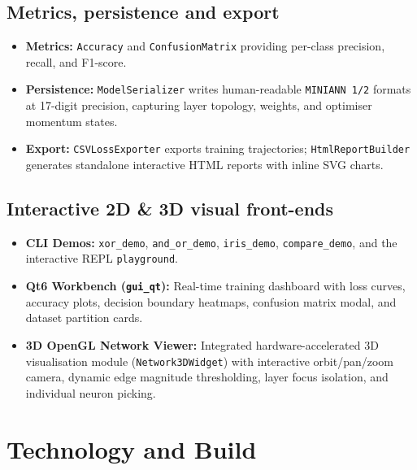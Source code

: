\documentclass[11pt,a4paper]{article}
\begin{document}
\subsection{Metrics, persistence and export}
\begin{itemize}[itemsep=1pt]
    \item \textbf{Metrics:} \texttt{Accuracy} and \texttt{ConfusionMatrix} providing per-class precision, recall, and F1-score.
    \item \textbf{Persistence:} \texttt{ModelSerializer} writes human-readable \texttt{MINIANN 1/2} formats at 17-digit precision, capturing layer topology, weights, and optimiser momentum states.
    \item \textbf{Export:} \texttt{CSVLossExporter} exports training trajectories; \texttt{HtmlReportBuilder} generates standalone interactive HTML reports with inline SVG charts.
\end{itemize}

\subsection{Interactive 2D \& 3D visual front-ends}
\begin{itemize}[itemsep=1pt]
    \item \textbf{CLI Demos:} \texttt{xor\_demo}, \texttt{and\_or\_demo}, \texttt{iris\_demo}, \texttt{compare\_demo}, and the interactive REPL \texttt{playground}.
    \item \textbf{Qt6 Workbench (\texttt{gui\_qt}):} Real-time training dashboard with loss curves, accuracy plots, decision boundary heatmaps, confusion matrix modal, and dataset partition cards.
    \item \textbf{3D OpenGL Network Viewer:} Integrated hardware-accelerated 3D visualisation module (\texttt{Network3DWidget}) with interactive orbit/pan/zoom camera, dynamic edge magnitude thresholding, layer focus isolation, and individual neuron picking.
\end{itemize}

\section{Technology and Build}
\end{document}
